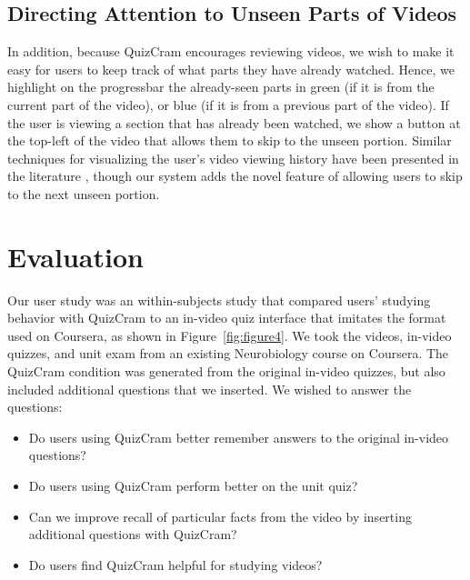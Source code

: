 \documentclass{sigchi}
\begin{document}
\subsection{Directing Attention to Unseen Parts of Videos}

In addition, because QuizCram encourages reviewing videos, we wish to make it easy for users to keep track of what parts they have already watched. Hence, we highlight on the progressbar the already-seen parts in green (if it is from the current part of the video), or blue (if it is from a previous part of the video). If the user is viewing a section that has already been watched, we show a button at the top-left of the video that allows them to skip to the unseen portion. Similar techniques for visualizing the user's video viewing history have been presented in the literature \cite{socialnavigation} \cite{lecturescape}, though our system adds the novel feature of allowing users to skip to the next unseen portion.


\section{Evaluation}

Our user study was an within-subjects study that compared users' studying behavior with QuizCram to an in-video quiz interface that imitates the format used on Coursera, as shown in Figure~\ref{fig:figure4}. We took the videos, in-video quizzes, and unit exam from an existing Neurobiology course on Coursera. The QuizCram condition was generated from the original in-video quizzes, but also included additional questions that we inserted. We wished to answer the questions:

\begin{itemize}
\item Do users using QuizCram better remember answers to the original in-video questions?
\item Do users using QuizCram perform better on the unit quiz?
\item Can we improve recall of particular facts from the video by inserting additional questions with QuizCram?
\item Do users find QuizCram helpful for studying videos?
\end{itemize}
\end{document}
